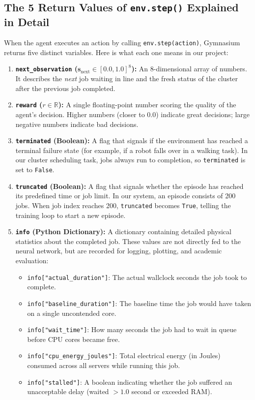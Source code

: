 \documentclass[11pt,a4paper]{article}
\begin{document}
\subsection{The 5 Return Values of \texttt{env.step()} Explained in Detail}
When the agent executes an action by calling \texttt{env.step(action)}, Gymnasium returns five distinct variables. Here is what each one means in our project:
\begin{enumerate}[noitemsep, topsep=2pt]
    \item \textbf{\texttt{next\_observation} ($\mathbf{s}_{\text{next}} \in [0.0, 1.0]^8$):} An 8-dimensional array of numbers. It describes the \textit{next} job waiting in line and the fresh status of the cluster after the previous job completed.
    \item \textbf{\texttt{reward} ($r \in \mathbb{R}$):} A single floating-point number scoring the quality of the agent's decision. Higher numbers (closer to 0.0) indicate great decisions; large negative numbers indicate bad decisions.
    \item \textbf{\texttt{terminated} (Boolean):} A flag that signals if the environment has reached a terminal failure state (for example, if a robot falls over in a walking task). In our cluster scheduling task, jobs always run to completion, so \texttt{terminated} is set to \texttt{False}.
    \item \textbf{\texttt{truncated} (Boolean):} A flag that signals whether the episode has reached its predefined time or job limit. In our system, an episode consists of 200 jobs. When job index reaches 200, \texttt{truncated} becomes \texttt{True}, telling the training loop to start a new episode.
    \item \textbf{\texttt{info} (Python Dictionary):} A dictionary containing detailed physical statistics about the completed job. These values are not directly fed to the neural network, but are recorded for logging, plotting, and academic evaluation:
    \begin{itemize}[noitemsep, topsep=1pt]
        \item \texttt{info["actual\_duration"]}: The actual wallclock seconds the job took to complete.
        \item \texttt{info["baseline\_duration"]}: The baseline time the job would have taken on a single uncontended core.
        \item \texttt{info["wait\_time"]}: How many seconds the job had to wait in queue before CPU cores became free.
        \item \texttt{info["cpu\_energy\_joules"]}: Total electrical energy (in Joules) consumed across all servers while running this job.
        \item \texttt{info["stalled"]}: A boolean indicating whether the job suffered an unacceptable delay (waited $>1.0$ second or exceeded RAM).
    \end{itemize}
\end{enumerate}
\end{document}
